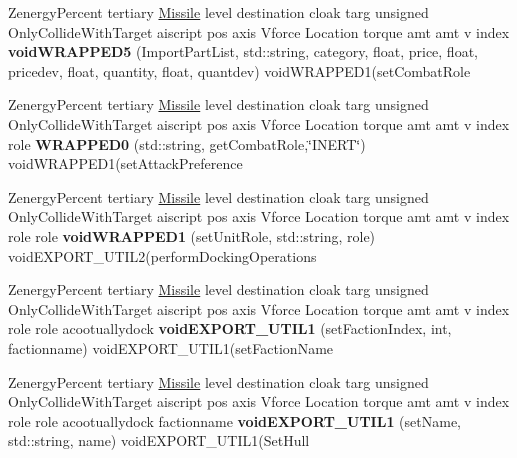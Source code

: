 \begin{DoxyCompactItemize}
\item 
Zenergy\+Percent tertiary \hyperlink{classMissile}{Missile} level destination cloak targ unsigned Only\+Collide\+With\+Target aiscript pos axis Vforce Location torque amt amt v index {\bfseries void\+W\+R\+A\+P\+P\+E\+D5} (Import\+Part\+List, std\+::string, category, float, price, float, pricedev, float, quantity, float, quantdev) void\+W\+R\+A\+P\+P\+E\+D1(set\+Combat\+Role\hypertarget{classUnitWrapper_ab4f5fac4e193c99638925aee8981ecc9}{}\label{classUnitWrapper_ab4f5fac4e193c99638925aee8981ecc9}

\item 
Zenergy\+Percent tertiary \hyperlink{classMissile}{Missile} level destination cloak targ unsigned Only\+Collide\+With\+Target aiscript pos axis Vforce Location torque amt amt v index role {\bfseries W\+R\+A\+P\+P\+E\+D0} (std\+::string, get\+Combat\+Role,\char`\"{}I\+N\+E\+RT\char`\"{}) void\+W\+R\+A\+P\+P\+E\+D1(set\+Attack\+Preference\hypertarget{classUnitWrapper_a59f9e4ff8d6a509edebbf2ea27347dcf}{}\label{classUnitWrapper_a59f9e4ff8d6a509edebbf2ea27347dcf}

\item 
Zenergy\+Percent tertiary \hyperlink{classMissile}{Missile} level destination cloak targ unsigned Only\+Collide\+With\+Target aiscript pos axis Vforce Location torque amt amt v index role role {\bfseries void\+W\+R\+A\+P\+P\+E\+D1} (set\+Unit\+Role, std\+::string, role) void\+E\+X\+P\+O\+R\+T\+\_\+\+U\+T\+I\+L2(perform\+Docking\+Operations\hypertarget{classUnitWrapper_a960437d8c14b16788fb53e5bbbafd846}{}\label{classUnitWrapper_a960437d8c14b16788fb53e5bbbafd846}

\item 
Zenergy\+Percent tertiary \hyperlink{classMissile}{Missile} level destination cloak targ unsigned Only\+Collide\+With\+Target aiscript pos axis Vforce Location torque amt amt v index role role acootuallydock {\bfseries void\+E\+X\+P\+O\+R\+T\+\_\+\+U\+T\+I\+L1} (set\+Faction\+Index, int, factionname) void\+E\+X\+P\+O\+R\+T\+\_\+\+U\+T\+I\+L1(set\+Faction\+Name\hypertarget{classUnitWrapper_ab272c3d4849007fd7032ee8570cd4771}{}\label{classUnitWrapper_ab272c3d4849007fd7032ee8570cd4771}

\item 
Zenergy\+Percent tertiary \hyperlink{classMissile}{Missile} level destination cloak targ unsigned Only\+Collide\+With\+Target aiscript pos axis Vforce Location torque amt amt v index role role acootuallydock factionname {\bfseries void\+E\+X\+P\+O\+R\+T\+\_\+\+U\+T\+I\+L1} (set\+Name, std\+::string, name) void\+E\+X\+P\+O\+R\+T\+\_\+\+U\+T\+I\+L1(Set\+Hull\hypertarget{classUnitWrapper_a439cebf1fce12b844cbd3f503d978f28}{}\label{classUnitWrapper_a439cebf1fce12b844cbd3f503d978f28}


\end{DoxyCompactItemize}
